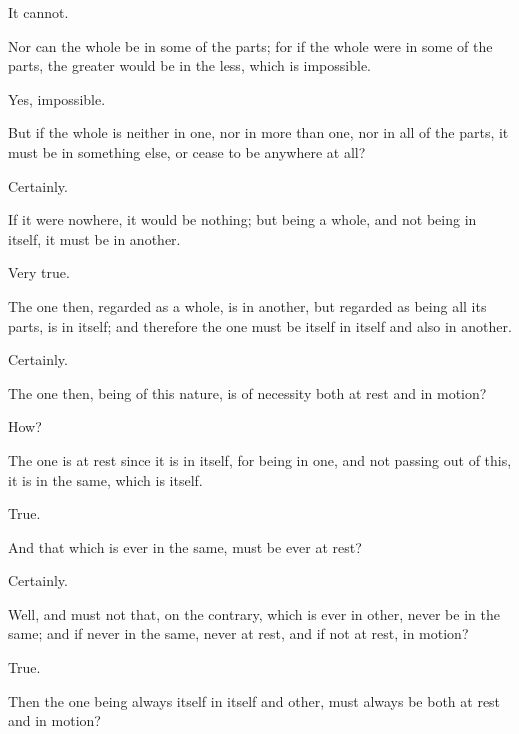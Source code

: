 \documentclass[11pt,letter]{article}
\begin{document}
\par  It cannot.

\par  Nor can the whole be in some of the parts; for if the whole were in some of the parts, the greater would be in the less, which is impossible.

\par  Yes, impossible.

\par  But if the whole is neither in one, nor in more than one, nor in all of the parts, it must be in something else, or cease to be anywhere at all?

\par  Certainly.

\par  If it were nowhere, it would be nothing; but being a whole, and not being in itself, it must be in another.

\par  Very true.

\par  The one then, regarded as a whole, is in another, but regarded as being all its parts, is in itself; and therefore the one must be itself in itself and also in another.

\par  Certainly.

\par  The one then, being of this nature, is of necessity both at rest and in motion?

\par  How?

\par  The one is at rest since it is in itself, for being in one, and not passing out of this, it is in the same, which is itself.

\par  True.

\par  And that which is ever in the same, must be ever at rest?

\par  Certainly.

\par  Well, and must not that, on the contrary, which is ever in other, never be in the same; and if never in the same, never at rest, and if not at rest, in motion?

\par  True.

\par  Then the one being always itself in itself and other, must always be both at rest and in motion?
\end{document}
